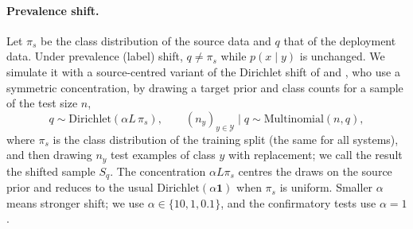 \paragraph{Prevalence shift.}
Let $\pi_s$ be the class distribution of the source data and $q$ that of the deployment data. Under prevalence (label)
shift, $q\neq\pi_s$ while $p(x\mid y)$ is unchanged. We simulate it with a source-centred variant of the Dirichlet shift
of \citet{lipton2018detecting} and \citet{alexandari2020maximum}, who use a symmetric concentration, by drawing a target
prior and class counts for a sample of the test size $n$,
\begin{equation}
  q\sim\mathrm{Dirichlet}(\alpha L\,\pi_s),\qquad (n_y)_{y\in\mathcal{Y}}\mid q\sim\mathrm{Multinomial}(n,q),
  \label{eq:shift}
\end{equation}
where $\pi_s$ is the class distribution of the training split (the same for all systems), and then drawing $n_y$ test
examples of class $y$ with replacement; we call the result the shifted sample $S_q$. The concentration $\alpha L\pi_s$
centres the draws on the source prior and reduces to the usual $\mathrm{Dirichlet}(\alpha\mathbf{1})$ when $\pi_s$ is
uniform. Smaller $\alpha$ means stronger shift; we use $\alpha\in\{10,1,0.1\}$, and the confirmatory tests use $\alpha=1$.

